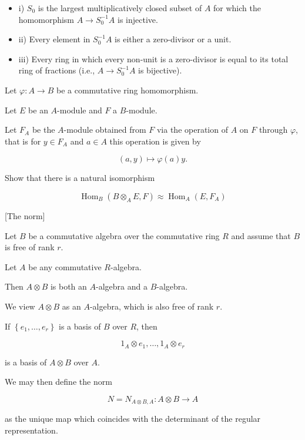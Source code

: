 \begin{itemize}
    \item i) $S_0$ is the largest multiplicatively closed subset of $A$ for which the homomorphism $A \rightarrow S_0^{-1} A$ is injective.

    \item ii) Every element in $S_0^{-1} A$ is either a zero-divisor or a unit.

    \item iii) Every ring in which every non-unit is a zero-divisor is equal to its total ring of fractions (i.e., $A \rightarrow S_0^{-1} A$ is bijective).
\end{itemize}



Let $\varphi: A \rightarrow B$ be a commutative ring homomorphism.

Let $E$ be an $A$-module and $F$ a $B$-module.

Let $F_A$ be the $A$-module obtained from $F$ via the operation of $A$ on $F$ through $\varphi$, that is for $y \in F_A$ and $a \in A$ this operation is given by

$$
(a, y) \mapsto \varphi(a) y .
$$

Show that there is a natural isomorphism

$$
\operatorname{Hom}_B\left(B \otimes_A E, F\right) \approx \operatorname{Hom}_A\left(E, F_A\right)
$$


[The norm]

Let $B$ be a commutative algebra over the commutative ring $R$ and assume that $B$ is free of rank $r$.

Let $A$ be any commutative $R$-algebra.

Then $A \otimes B$ is both an $A$-algebra and a $B$-algebra.

We view $A \otimes B$ as an $A$-algebra, which is also free of rank $r$.

If $\left\{e_1, \ldots, e_r\right\}$ is a basis of $B$ over $R$, then

$$
1_A \otimes e_1, \ldots, 1_A \otimes e_r
$$

is a basis of $A \otimes B$ over $A$.

We may then define the norm

$$
N=N_{A \otimes B, A}: A \otimes B \rightarrow A
$$

as the unique map which coincides with the determinant of the regular representation.

